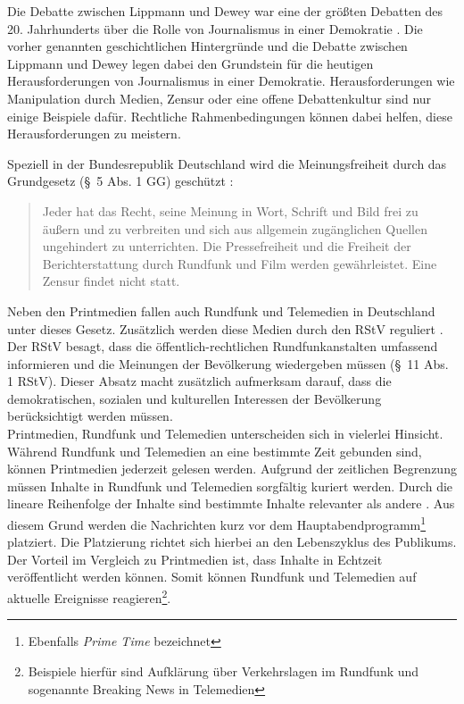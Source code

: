 Die Debatte zwischen Lippmann und Dewey war eine der größten Debatten des 20. Jahrhunderts über die Rolle von Journalismus in einer Demokratie \cite{lippmann-dewey-debate}.
Die vorher genannten geschichtlichen Hintergründe und die Debatte zwischen Lippmann und Dewey legen dabei den Grundstein für die heutigen Herausforderungen von Journalismus in einer Demokratie.
Herausforderungen wie Manipulation durch Medien, Zensur oder eine offene Debattenkultur sind nur einige Beispiele dafür.
Rechtliche Rahmenbedingungen können dabei helfen, diese Herausforderungen zu meistern.

Speziell in der Bundesrepublik Deutschland wird die Meinungsfreiheit durch das Grundgesetz (§ 5 Abs. 1 GG) geschützt \cite{gg}:
\begin{quote}
    \glqq Jeder hat das Recht, seine Meinung in Wort, Schrift und Bild frei zu äußern und zu verbreiten und sich aus allgemein zugänglichen Quellen ungehindert zu unterrichten.
    Die Pressefreiheit und die Freiheit der Berichterstattung durch Rundfunk und Film werden gewährleistet.
    Eine Zensur findet nicht statt.\grqq{}
\end{quote}
Neben den Printmedien fallen auch Rundfunk und Telemedien in Deutschland unter dieses Gesetz.
Zusätzlich werden diese Medien durch den \ac{RStV} reguliert \cite{rundfunkstaatsvertrag}.
Der \ac{RStV} besagt, dass die öffentlich-rechtlichen Rundfunkanstalten umfassend informieren und die Meinungen der Bevölkerung wiedergeben müssen (§ 11 Abs. 1 \ac{RStV}).
Dieser Absatz macht zusätzlich aufmerksam darauf, dass die demokratischen, sozialen und kulturellen Interessen der Bevölkerung berücksichtigt werden müssen. \\

Printmedien, Rundfunk und Telemedien unterscheiden sich in vielerlei Hinsicht.
Während Rundfunk und Telemedien an eine bestimmte Zeit gebunden sind, können Printmedien jederzeit gelesen werden.
Aufgrund der zeitlichen Begrenzung müssen Inhalte in Rundfunk und Telemedien sorgfältig kuriert werden.
Durch die lineare Reihenfolge der Inhalte sind bestimmte Inhalte relevanter als andere \cite{rundfunk}.
Aus diesem Grund werden die Nachrichten kurz vor dem Hauptabendprogramm\footnote{Ebenfalls \textit{Prime Time} bezeichnet} platziert.
Die Platzierung richtet sich hierbei an den Lebenszyklus des Publikums.
Der Vorteil im Vergleich zu Printmedien ist, dass Inhalte in Echtzeit veröffentlicht werden können.
Somit können Rundfunk und Telemedien auf aktuelle Ereignisse reagieren\footnote{Beispiele hierfür sind Aufklärung über Verkehrslagen im Rundfunk und sogenannte Breaking News in Telemedien}. \\

